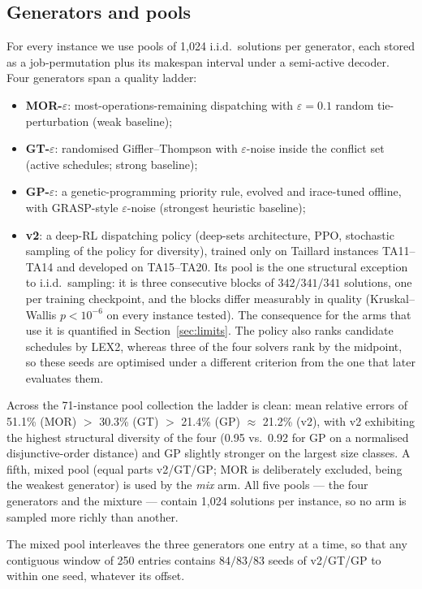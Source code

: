 \documentclass[review]{elsarticle}
\begin{document}
\subsection{Generators and pools}
For every instance we use pools of 1{,}024 i.i.d.\ solutions per generator,
each stored as a job-permutation plus its makespan interval under a
semi-active decoder. Four generators span a quality ladder:
\begin{itemize}
\item \textbf{MOR-$\varepsilon$}: most-operations-remaining dispatching
  with $\varepsilon=0.1$ random tie-perturbation (weak baseline);
\item \textbf{GT-$\varepsilon$}: randomised Giffler--Thompson with
  $\varepsilon$-noise inside the conflict set (active schedules; strong
  baseline);
\item \textbf{GP-$\varepsilon$}: a genetic-programming priority rule,
  evolved and irace-tuned offline, with GRASP-style $\varepsilon$-noise
  (strongest heuristic baseline);
\item \textbf{v2}: a deep-RL dispatching policy (deep-sets architecture,
  PPO, stochastic sampling of the policy for diversity), trained only on
  Taillard instances TA11--TA14 and developed on TA15--TA20. Its pool is
  the one structural exception to i.i.d.\ sampling: it is three
  consecutive blocks of $342/341/341$ solutions, one per training
  checkpoint, and the blocks differ measurably in quality (Kruskal--Wallis
  $p<10^{-6}$ on every instance tested). The consequence for the arms that
  use it is quantified in Section~\ref{sec:limits}. The policy also ranks
  candidate schedules by LEX2, whereas three of the four solvers rank by
  the midpoint, so these seeds are optimised under a different criterion
  from the one that later evaluates them.
\end{itemize}
Across the 71-instance pool collection the ladder is clean: mean relative
errors of 51.1\% (MOR) $>$ 30.3\% (GT) $>$ 21.4\% (GP) $\approx$ 21.2\%
(v2), with v2 exhibiting the highest structural diversity of the four
(0.95 vs.\ 0.92 for GP on a normalised disjunctive-order distance) and GP
slightly stronger on the largest size classes. A fifth, mixed pool
(equal parts v2/GT/GP; MOR is deliberately excluded, being the weakest
generator) is used by the \emph{mix} arm. All five pools --- the four generators and the mixture --- contain 1{,}024
solutions per instance, so no arm is sampled more richly than another.

The mixed pool interleaves the three generators one entry at a time, so
that any contiguous window of 250 entries contains $84/83/83$ seeds of
v2/GT/GP to within one seed, whatever its offset.
\end{document}
